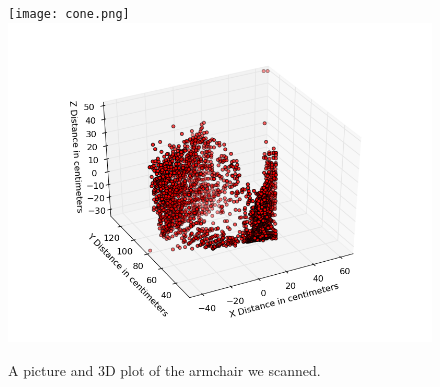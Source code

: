 \documentclass{article}
\begin{document}
\begin{figure}[h!]
\begin{center}
\texttt{[image: cone.png]}
\includegraphics[scale=0.8]{cone_scan.png}
\caption{A picture and 3D plot of the armchair we scanned.}
\end{center}
\end{figure}
\end{document}
